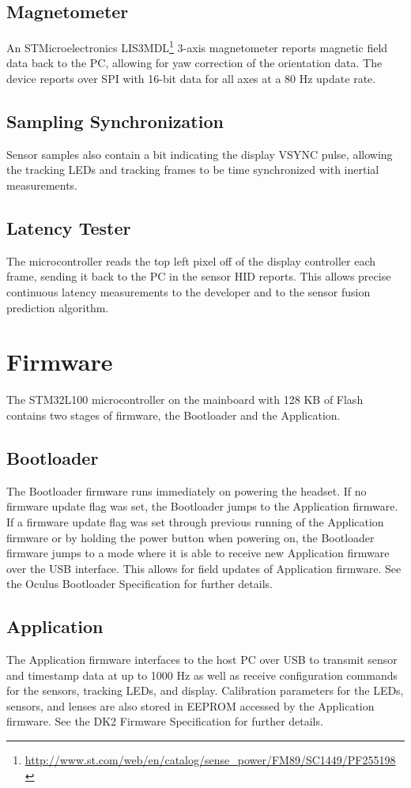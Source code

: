 \documentclass[letterpaper]{article}
\begin{document}
\subsection{Magnetometer}
An STMicroelectronics LIS3MDL\footnote{\url{http://www.st.com/web/en/catalog/sense_power/FM89/SC1449/PF255198}} 3-axis magnetometer reports magnetic field data back to the PC, allowing for yaw correction of the orientation data.  The device reports over SPI with 16-bit data for all axes at a 80 Hz update rate.

\subsection{Sampling Synchronization}
Sensor samples also contain a bit indicating the display VSYNC pulse, allowing the tracking LEDs and tracking frames to be time synchronized with inertial measurements.

\subsection{Latency Tester}
The microcontroller reads the top left pixel off of the display controller each frame, sending it back to the PC in the sensor HID reports.  This allows precise continuous latency measurements to the developer and to the sensor fusion prediction algorithm.

\newpage

\section{Firmware}
The STM32L100 microcontroller on the mainboard with 128 KB of Flash contains two stages of firmware, the Bootloader and the Application.

\subsection{Bootloader}
The Bootloader firmware runs immediately on powering the headset.  If no firmware update flag was set, the Bootloader jumps to the Application firmware.  If a firmware update flag was set through previous running of the Application firmware or by holding the power button when powering on, the Bootloader firmware jumps to a mode where it is able to receive new Application firmware over the USB interface.  This allows for field updates of Application firmware.  See the Oculus Bootloader Specification for further details.

\subsection{Application}
The Application firmware interfaces to the host PC over USB to transmit sensor and timestamp data at up to 1000 Hz as well as receive configuration commands for the sensors, tracking LEDs, and display.  Calibration parameters for the LEDs, sensors, and lenses are also stored in EEPROM accessed by the Application firmware.  See the DK2 Firmware Specification for further details.
\end{document}
